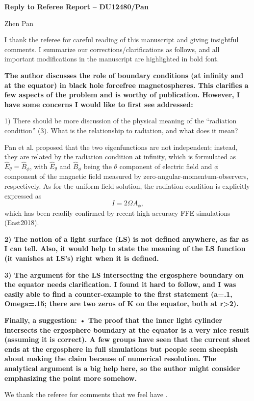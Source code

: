 \documentclass[10pt]{article}
\begin{document}

\begin{center}
{{\large\bf Reply to Referee Report -- DU12480/Pan}}
\end{center}

\begin{center}
{\normalsize Zhen Pan}
\end{center}


I thank the referee for  careful reading of this manuscript and
giving insightful comments. I summarize our corrections/clarifications as follows,
and all important modifications in the manuscript are highlighted in bold font.\\

{\bf The author discusses the role of boundary conditions (at infinity and at the equator) in black hole forcefree
magnetospheres. This clarifies a few aspects of the problem and is worthy of publication.
However, I have some concerns I would like to first see addressed:

1) There should be more discussion of the physical meaning of the “radiation condition” (3). What
is the relationship to radiation, and what does it mean? }

Pan et al.  proposed that the two eigenfunctions are not independent;
instead, they are related by the radiation condition at infinity, which is formulated as
$\hat E_\theta = \hat B_\phi$, with $\hat E_\theta$ and $\hat B_\phi$ being the $\theta$
component of electric field and $\phi$ component of the magnetic field measured
by zero-angular-momentum-observers, respectively.
As for the uniform field solution, the radiation condition is explicitly expressed as
\[ I = 2\Omega A_\phi, \]
which has been readily confirmed by recent high-accuracy FFE simulations (East2018).


{\bf 2) The notion of a light surface (LS) is not defined anywhere, as far as I can tell. Also, it would help
to state the meaning of the LS function (it vanishes at LS’s) right when it is defined.}


{\bf 3) The argument for the LS intersecting the ergosphere boundary on the equator needs
clarification. I found it hard to follow, and I was easily able to find a counter-example to the first
statement (a=.1, Omega=.15; there are two zeros of K on the equator, both at r>2). }


{\bf Finally, a suggestion:
• The proof that the inner light cylinder intersects the ergosphere boundary at the equator is
a very nice result (assuming it is correct). A few groups have seen that the current sheet
ends at the ergosphere in full simulations but people seem sheepish about making the claim
because of numerical resolution. The analytical argument is a big help here, so the author
might consider emphasizing the point more somehow.}



We thank the referee for comments that we feel have .
\end{document}
